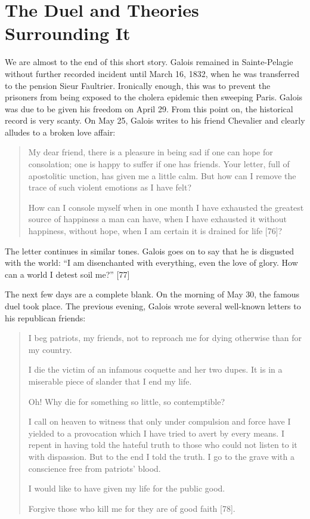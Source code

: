 \documentclass[12pt]{article}
\begin{document}
\section{The Duel and Theories Surrounding It}

We are almost to the end of this short story. Galois remained in Sainte-Pelagie without further recorded incident until March 16, 1832, when he was transferred to the pension Sieur Faultrier. Ironically enough, this was to prevent the prisoners from being exposed to the cholera epidemic then sweeping Paris. Galois was due to be given his freedom on April 29. From this point on, the historical record is very scanty. On May 25, Galois writes to his friend Chevalier and clearly alludes to a broken love affair:

\begin{quotation}

My dear friend, there is a pleasure in being sad if one can hope for consolation; one is happy to suffer if one has friends. Your letter, full of apostolitic unction, has given me a little calm. But how can I remove the trace of such violent emotions as I have felt? 

How can I console myself when in one month I have exhausted the greatest source of happiness a man can have, when I have exhausted it without happiness, without hope, when I am certain it is drained for life [76]?
\end{quotation}

The letter continues in similar tones. Galois goes on to say that he is disgusted with the world: ``I am disenchanted with everything, even the love of glory. How can a world I detest soil me?'' [77]

The next few days are a complete blank. On the morning of May 30, the famous duel took place. The previous evening, Galois wrote several well-known letters to his republican friends:

\begin{quotation}
I beg patriots, my friends, not to reproach me for dying otherwise than for my country. 

I die the victim of an infamous coquette and her two dupes. It is in a miserable piece of slander that I end my life. 

Oh! Why die for something so little, so contemptible? 

I call on heaven to witness that only under compulsion and force have I yielded to a provocation which I have tried to avert by every means. I repent in having told the hateful truth to those who could not listen to it with dispassion. But to the end I told the truth. I go to the grave with a conscience free from patriots' blood. 

I would like to have given my life for the public good. 

Forgive those who kill me for they are of good faith [78].
\end{quotation}
\end{document}
